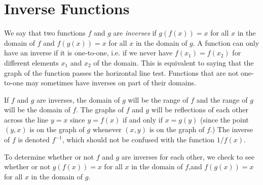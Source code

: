 \section{Inverse Functions}\label{sec:inv_funcs}

We say that two functions $f$ and $g$ are \emph{inverses} if $g(f(x))=x$ for all $x$ in the domain of $f$ and $f(g(x))=x$ for all $x$ in the domain of $g$. A function can only have an inverse if it is one-to-one, i.e. if we never have $f(x_1)=f(x_2)$ for different elements $x_1$ and $x_2$ of the domain. This is equivalent to saying that the graph of the function passes the horizontal line test. Functions that are not one-to-one may sometimes have inverses on part of their domains.

If $f$ and $g$ are inverses, the domain of $g$ will be the range of $f$ and the range of $g$ will be the domain of $f$. The graphs of $f$ and $g$ will be reflections of each other across the line $y=x$ since $y=f(x)$ if and only if $x=g(y)$ (since the point $(y,x)$ is on the graph of $g$ whenever $(x,y)$ is on the graph of $f$.)  The inverse of $f$ is denoted $f^{-1}$, which should not be confused with the function $1/f(x)$.

To determine whether or not $f$ and $g$ are inverses for each other, we check to see whether or not $g(f(x))=x$ for all $x$ in the domain of $f$,and $f(g(x))=x$ for all $x$ in the domain of $g$.



